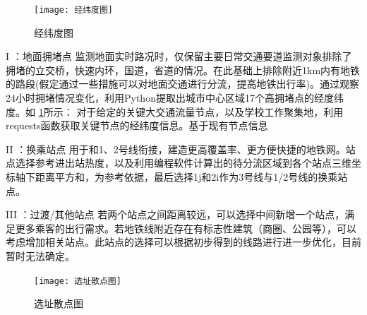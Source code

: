 \documentclass[12pt,a4paper]{mcmthesis}
\begin{document}
    \begin{figure}[h!t]
        \centerline{\texttt{[image: 经纬度图]}\quad
        }
        \caption{\song\wuhao
        经纬度图}
        \label{fig:经纬度图}
    \end{figure}
    I ：地面拥堵点
    监测地面实时路况时，仅保留主要日常交通要道监测对象排除了拥堵的立交桥，快速内环，国道，省道的情况。在此基础上排除附近1km内有地铁的路段(假定通过一些措施可以对地面交通进行分流，提高地铁出行率)。通过观察24小时拥堵情况变化，利用Python提取出城市中心区域17个高拥堵点的经度纬度。如 \ref{fig:经纬度图}所示：
    对于给定的关键大交通流量节点，以及学校工作聚集地，利用requests函数获取关键节点的经纬度信息。基于现有节点信息

    II ：换乘站点
    用于和1、2号线衔接，建造更高覆盖率、更方便快捷的地铁网。站点选择参考进出站热度，以及利用编程软件计算出的待分流区域到各个站点三维坐标轴下距离平方和，为参考依据，最后选择1j和2i作为3号线与1/2号线的换乘站点。

    III ：过渡/其他站点
    若两个站点之间距离较远，可以选择中间新增一个站点，满足更多乘客的出行需求。若地铁线附近存在有标志性建筑（商圈、公园等），可以考虑增加相关站点。此站点的选择可以根据初步得到的线路进行进一步优化，目前暂时无法确定。


    \begin{figure}[h!t]
        \centerline{\texttt{[image: 选址散点图]}\quad
        }
        \caption{\song\wuhao
        选址散点图}
        \label{fig:选址散点图}
    \end{figure}
\end{document}
